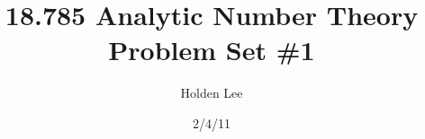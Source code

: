 \documentclass[12pt]{article}
\theoremstyle{norm}
\begin{document}
\title{18.785 Analytic Number Theory Problem Set \#1}%
\author{Holden Lee}
\date{2/4/11}%
\maketitle
\thispagestyle{empty}
%
\end{document}
